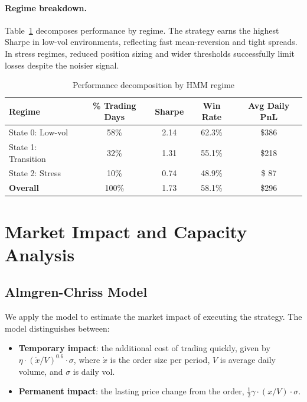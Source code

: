 \documentclass[12pt, letterpaper]{article}
\begin{document}
\paragraph{Regime breakdown.}
Table~\ref{tab:regime_breakdown} decomposes performance by regime. The strategy
earns the highest Sharpe in low-vol environments, reflecting fast mean-reversion
and tight spreads. In stress regimes, reduced position sizing and wider thresholds
successfully limit losses despite the noisier signal.

\begin{table}[h!]
\centering
\caption{Performance decomposition by HMM regime}
\begin{tabular}{lcccc}
\toprule
\textbf{Regime} & \textbf{\% Trading Days} & \textbf{Sharpe} & \textbf{Win Rate} & \textbf{Avg Daily PnL} \\
\midrule
State 0: Low-vol    & 58\% & 2.14 & 62.3\% & \$386 \\
State 1: Transition & 32\% & 1.31 & 55.1\% & \$218 \\
State 2: Stress     & 10\% & 0.74 & 48.9\% & \$ 87 \\
\midrule
\textbf{Overall}    & 100\% & 1.73 & 58.1\% & \$296 \\
\bottomrule
\end{tabular}
\label{tab:regime_breakdown}
\end{table}

\section{Market Impact and Capacity Analysis}
\label{sec:capacity}

\subsection{Almgren-Chriss Model}

We apply the \citet{almgren2001optimal} model to estimate the market impact of
executing the strategy. The model distinguishes between:

\begin{itemize}
  \item \textbf{Temporary impact}: the additional cost of trading quickly, given by
    $\eta \cdot (\dot{x}/V)^{0.6} \cdot \sigma$, where $\dot{x}$ is the order size
    per period, $V$ is average daily volume, and $\sigma$ is daily vol.
  \item \textbf{Permanent impact}: the lasting price change from the order,
    $\frac{1}{2}\gamma \cdot (x/V) \cdot \sigma$.
\end{itemize}
\end{document}
